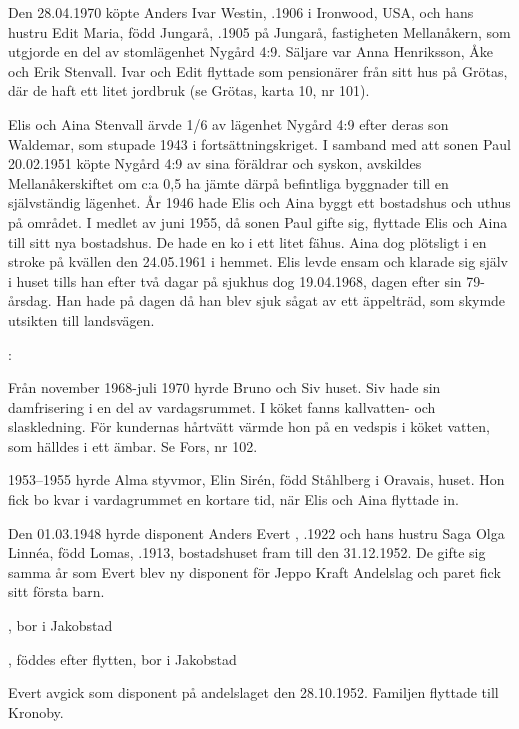 %
Den 28.04.1970 köpte Anders Ivar Westin, .1906 i Ironwood, USA, och hans hustru Edit Maria, född Jungarå, .1905 	på Jungarå,	fastigheten Mellanåkern, som utgjorde en del av stomlägenhet Nygård 4:9. Säljare var Anna Henriksson, Åke och Erik Stenvall. Ivar och Edit flyttade som pensionärer från sitt hus på Grötas, där de haft ett litet jordbruk (se Grötas, karta 10, nr 101).


%
Elis och Aina Stenvall ärvde 1/6 av lägenhet Nygård 4:9 efter deras son Waldemar, som stupade 1943 i fortsättningskriget. I samband med att sonen Paul 20.02.1951 köpte Nygård 4:9 av sina föräldrar och syskon, avskildes Mellanåkerskiftet om c:a 0,5 ha jämte därpå befintliga byggnader till en självständig lägenhet. År 1946 hade Elis och Aina byggt ett bostadshus och uthus på området. I medlet av juni 1955, då sonen Paul gifte sig, flyttade Elis och Aina till sitt nya bostadshus. De hade en ko i ett litet fähus. Aina dog plötsligt i en stroke på kvällen den 24.05.1961 i hemmet. Elis levde ensam och klarade sig själv i huset tills han efter två dagar på sjukhus dog 19.04.1968, dagen efter sin 79-årsdag. Han hade på dagen då han blev sjuk sågat av ett äppelträd, som skymde utsikten till landsvägen.


:

Från november 1968-juli 1970 hyrde Bruno och Siv  huset. Siv hade sin damfrisering i en del av vardagsrummet. I köket fanns kallvatten- och slaskledning. För kundernas hårtvätt värmde hon på en	vedspis i köket vatten, som hälldes i ett ämbar. Se Fors, nr 102.

1953--1955 hyrde Alma  styvmor, Elin Sirén, född Ståhlberg i Oravais, huset. Hon fick bo kvar i vardagrummet en kortare tid, när Elis och Aina flyttade in.

Den 01.03.1948 hyrde disponent Anders Evert , .1922 och hans hustru Saga Olga Linnéa, född Lomas, .1913, bostadshuset fram till den 31.12.1952. De gifte sig samma år som Evert blev ny disponent för Jeppo Kraft Andelslag och paret fick sitt första barn.
\begin{jhchildren}
  \item {}, bor i Jakobstad
  \item {}, föddes efter flytten, bor i Jakobstad
\end{jhchildren}
Evert avgick som disponent på andelslaget den 28.10.1952. Familjen flyttade till Kronoby.



